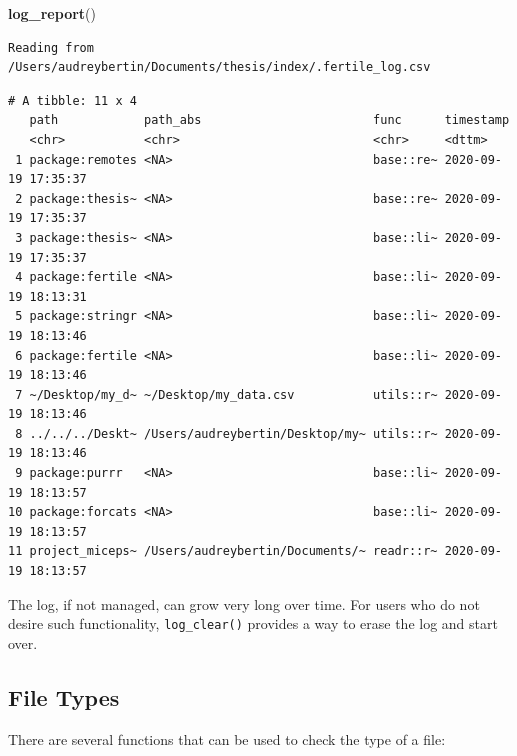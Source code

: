 \documentclass[12pt,twoside]{reedthesis}
\newenvironment{Shaded}{\begin{snugshade}}{\end{snugshade}}
\newcommand{\KeywordTok}[1]{\textcolor[rgb]{0.13,0.29,0.53}{\textbf{#1}}}
\newcommand{\NormalTok}[1]{#1}
\begin{document}
\footnotesize
\begin{Shaded}
\begin{Highlighting}[]
\KeywordTok{log_report}\NormalTok{()}
\end{Highlighting}
\end{Shaded}
\begin{verbatim}
Reading from /Users/audreybertin/Documents/thesis/index/.fertile_log.csv
\end{verbatim}
\begin{verbatim}
# A tibble: 11 x 4
   path            path_abs                        func      timestamp          
   <chr>           <chr>                           <chr>     <dttm>             
 1 package:remotes <NA>                            base::re~ 2020-09-19 17:35:37
 2 package:thesis~ <NA>                            base::re~ 2020-09-19 17:35:37
 3 package:thesis~ <NA>                            base::li~ 2020-09-19 17:35:37
 4 package:fertile <NA>                            base::li~ 2020-09-19 18:13:31
 5 package:stringr <NA>                            base::li~ 2020-09-19 18:13:46
 6 package:fertile <NA>                            base::li~ 2020-09-19 18:13:46
 7 ~/Desktop/my_d~ ~/Desktop/my_data.csv           utils::r~ 2020-09-19 18:13:46
 8 ../../../Deskt~ /Users/audreybertin/Desktop/my~ utils::r~ 2020-09-19 18:13:46
 9 package:purrr   <NA>                            base::li~ 2020-09-19 18:13:57
10 package:forcats <NA>                            base::li~ 2020-09-19 18:13:57
11 project_miceps~ /Users/audreybertin/Documents/~ readr::r~ 2020-09-19 18:13:57
\end{verbatim}
\normalsize

The log, if not managed, can grow very long over time. For users who do
not desire such functionality, \texttt{log\_clear()} provides a way to
erase the log and start over.

\subsection{File Types}\label{file-types}

There are several functions that can be used to check the type of a
file:
\end{document}
